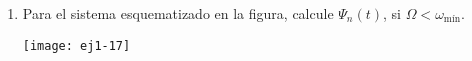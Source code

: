 \documentclass[11pt,spanish,a4paper]{article}
\begin{document}
\begin{enumerate}
\item
\begin{minipage}[t][3.5cm]{0.45\textwidth}
Para el sistema esquematizado en la figura, calcule $\Psi_{n}(t)$, si $\Omega<\omega_\textrm{mín}$.
\end{minipage}
\begin{minipage}[c][2cm][t]{0.5\textwidth}
  \texttt{[image: ej1-17]}
\end{minipage}




\end{enumerate}
\end{document}
